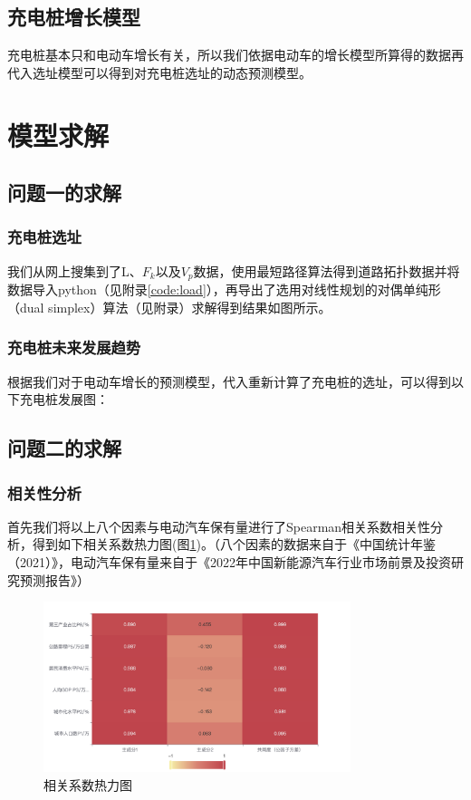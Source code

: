 \documentclass[12pt, a4paper, oneside]{ctexart}
\begin{document}
\subsection{充电桩增长模型}
充电桩基本只和电动车增长有关，所以我们依据电动车的增长模型所算得的数据再代入选址模型可以得到对充电桩选址的动态预测模型。
\section{模型求解}
\subsection{问题一的求解}
\subsubsection{充电桩选址}
我们从网上搜集到了L、\(F_k\)以及\(V_p\)数据，使用最短路径算法得到道路拓扑数据并将数据导入python（见附录\ref{code:load}），再导出了选用对线性规划的对偶单纯形（dual simplex）算法（见附录）求解得到结果如图所示。

\subsubsection{充电桩未来发展趋势}
根据我们对于电动车增长的预测模型，代入重新计算了充电桩的选址，可以得到以下充电桩发展图：


\subsection{问题二的求解}
\subsubsection{相关性分析}
首先我们将以上八个因素与电动汽车保有量进行了Spearman相关系数相关性分析，得到如下相关系数热力图(图\ref{fig:相关系数热力图})。（八个因素的数据来自于《中国统计年鉴（2021）》\cite{cite:统计年鉴}，电动汽车保有量来自于《2022年中国新能源汽车行业市场前景及投资研究预测报告》\cite{cite:预测报告}）
\begin{figure}[h]
    \centering
    \includegraphics[width=0.8\textwidth]{pic/相关系数热力图.png}
    \caption{相关系数热力图}
    \label{fig:相关系数热力图}
\end{figure}
\end{document}
